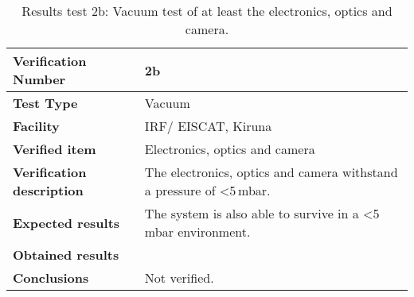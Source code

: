 \begin{table}[H]
\centering

\begin{tabular}{|m{}| m{} |}
\hline
\textbf{Verification Number} 		& 2b 							 \\ \hline
\textbf{Test Type} 					& Vacuum				 \\ \hline
\textbf{Facility} 					& IRF/ EISCAT, Kiruna 			 \\ \hline
\textbf{Verified item} 				& Electronics, optics and camera \\ \hline

\textbf{Verification description} 	& The electronics, optics and camera withstand a pressure of <5\,mbar. \\ \hline

\textbf{Expected results} 			& The system is also able to survive in a <5\,mbar environment.\\ \hline

\textbf{Obtained results} 			& \\ \hline

\textbf{Conclusions} 				& Not verified.		\\ \hline
\end{tabular}
\caption{Results test 2b: Vacuum test of at least the electronics, optics and camera.}
\label{tab:testresult2:vacuum}
\end{table}


\raggedbottom